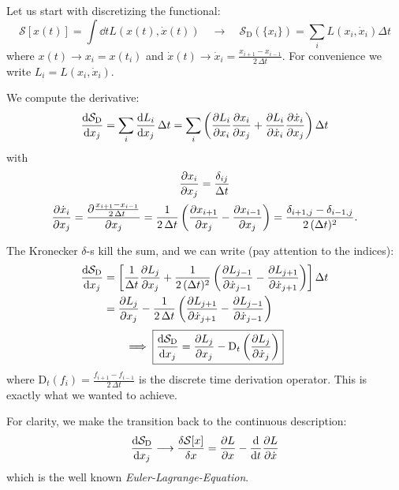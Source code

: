 \documentclass[11pt,a4paper]{scrartcl}
\newcommand{\SD}{\ensuremath{\mathcal{S}_{\mathrm{D}}}}
\newcommand{\xdoti}{\ensuremath{\dot{x}_i}}
\newcommand{\xdotj}{\ensuremath{\dot{x}_j}}
\newcommand{\xdotjm}{\ensuremath{\dot{x}_{j-1}}}
\newcommand{\deltaij}{\ensuremath{\delta_{ij}}}
\newcommand{\OverDeltaT}[1]{\ensuremath{\frac{#1}{\Delta t}}}
\newcommand{\DT}{\ensuremath{\mathrm{D}_t}}
\newcommand{\OverTwoDeltaT}[1]{\ensuremath{\frac{#1}{2\, \Delta t}}}
\newcommand{\xdotjp}{\ensuremath{\dot{x}_{j+1}}}
\begin{document}
Let us start with discretizing the functional:
\begin{equation}
    \mathcal{S}\left[x(t)\right] = \int\dd{t}L\left(x(t), \dot{x}(t)\right)
    \quad\longrightarrow\quad
    \SD\left(\{x_i\}\right) = \sum_i L\left(x_i, \xdoti\right)\Delta t
\end{equation}
where $x(t) \longrightarrow x_i = x(t_i)$ and $\dot{x}(t) \longrightarrow
\xdoti = \OverTwoDeltaT{x_{i+1}-x_{i-1}}$. For convenience we write $L_i = L(x_i, \xdoti)$.

We compute the derivative:
\begin{equation}
    \dv{\SD}{x_j} =\sum_i\dv{L_i}{x_j}\,\Delta t
    =\sum_i\left(\pdv{L_i}{x_i}\pdv{x_i}{x_j}+\pdv{L_i}{\xdoti}\pdv{\xdoti}{x_j}\right)
    \Delta t
\end{equation}
with
\begin{subequations}
\begin{gather}
    \pdv{x_i}{x_j}=\OverDeltaT{\deltaij} \\
    \pdv{\xdoti}{x_j}=\pdv{\OverTwoDeltaT{x_{i+1}-x_{i-1}}}{x_j}
    =\OverTwoDeltaT{1}\left(\pdv{x_{i+1}}{x_j}-\pdv{x_{i-1}}{x_j}\right)
    =\frac{\delta_{i+1,j}-\delta_{i-1,j}}{2\,(\Delta t)^2}.
\end{gather}
\end{subequations}

The Kronecker $\delta$-s kill the sum, and we can write (pay attention to the indices):
\begin{align*}
    \dv{\SD}{x_j}&=\left[\OverDeltaT{1}\pdv{L_j}{x_j}+\frac{1}{2\,(\Delta{t})^2}
    \left(\pdv{L_{j-1}}{\xdotjm}-\pdv{L_{j+1}}{\xdotjp}\right)\right]\Delta{t}
    \\
    &=\pdv{L_j}{x_j}-\OverTwoDeltaT{1}\left(\pdv{L_{j+1}}{\xdotjp}-\pdv{L_{j-1}}{\xdotjm}\right)
\end{align*}
\begin{equation}
    \implies\boxed{\dv{\SD}{x_j}=\pdv{L_j}{x_j}-\DT\left(\pdv{L_{j}}{\xdotj}\right)}
\end{equation}
where $\DT(f_i)=\OverTwoDeltaT{f_{i+1}-f_{i-1}}$ is the discrete time derivation
operator.
This is exactly what we wanted to achieve.

For clarity, we make the transition back to the continuous description:
\begin{equation}
    \dv{\SD}{x_j}\longrightarrow\fdv{\mathcal{S}[x]}{x}=\pdv{L}{x}-\dv{t}\pdv{L}{\dot{x}}
\end{equation}
which is the well known \emph{Euler-Lagrange-Equation}.
\end{document}
